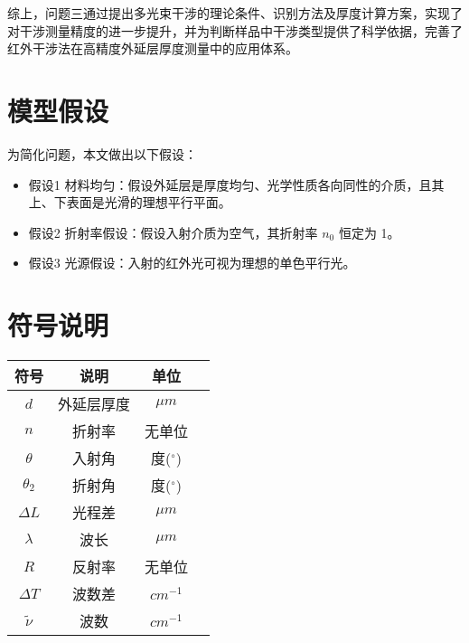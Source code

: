 \documentclass[withoutpreface,bwprint]{cumcmthesis}
\begin{document}
综上，问题三通过提出多光束干涉的理论条件、识别方法及厚度计算方案，实现了对干涉测量精度的进一步提升，并为判断样品中干涉类型提供了科学依据，完善了红外干涉法在高精度外延层厚度测量中的应用体系。


\section{模型假设}

为简化问题，本文做出以下假设：

\begin{itemize}[itemindent=2em]
\item 假设1 材料均匀：假设外延层是厚度均匀、光学性质各向同性的介质，且其上、下表面是光滑的理想平行平面。
\item 假设2 折射率假设：假设入射介质为空气，其折射率 $n_0$ 恒定为 1。

\item 假设3 光源假设：入射的红外光可视为理想的单色平行光。
\end{itemize}


\section{符号说明}
\begin{table}[H]
\centering
\begin{tabularx}{\textwidth}{CCCC}%
\toprule
符号    & 说明    & 单位    \\
\midrule
$d$     & 外延层厚度 & $\mu m$ \\
$n$     & 折射率 & 无单位 \\
$\theta$ & 入射角 & 度($^\circ$) \\
$\theta_2$ & 折射角 & 度($^\circ$) \\
$\Delta L$ & 光程差 & $\mu m$ \\
$\lambda$ & 波长 & $\mu m$ \\
$R$ & 反射率 & 无单位 \\
$\Delta T$ & 波数差 & $cm^{-1}$ \\

$\tilde{\nu}$ & 波数 & $cm^{-1}$ \\
\bottomrule
\end{tabularx}
\label{tab:符号说明}
\end{table}
\end{document}
